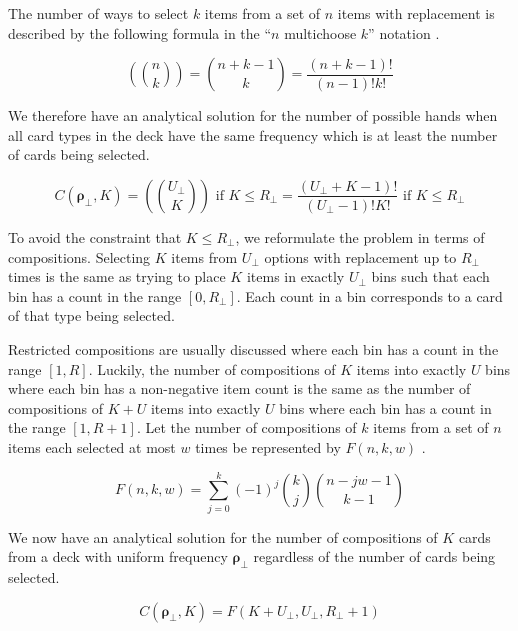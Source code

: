 \documentclass{article}
\begin{document}
The number of ways to select $k$ items from a set of $n$ items with replacement is described by the following formula in the ``$n$ multichoose $k$'' notation \cite{benjamin_quinn_2003}.

\begin{equation}
    \left (\binom{n}{k}\right) = \binom{n + k - 1}{k} = \frac{(n + k - 1)!}{(n - 1)!k!}
\end{equation}

We therefore have an analytical solution for the number of possible hands when all card types in the deck have the same frequency which is at least the number of cards being selected.

\begin{equation}
    C(\bm{\rho_{\bot}}, K) = \left (\binom{U_{\bot}}{K}\right) \text{ if } K \leq R_{\bot} = \frac{(U_{\bot} + K - 1)!}{(U_{\bot} - 1)!K!} \text{ if } K \leq R_{\bot}
\end{equation}

To avoid the constraint that $K\leq R_{\bot}$, we reformulate the problem in terms of compositions. Selecting $K$ items from $U_{\bot}$ options with replacement up to $R_\bot$ times is the same as trying to place $K$ items in exactly $U_{\bot}$ bins such that each bin has a count in the range $[0, R_{\bot}]$. Each count in a bin corresponds to a card of that type being selected.

Restricted compositions are usually discussed where each bin has a count in the range $[1, R]$. Luckily, the number of compositions of $K$ items into exactly $U$ bins where each bin has a non-negative item count is the same as the number of compositions of $K + U$ items into exactly $U$ bins where each bin has a count in the range $[1, R + 1]$. Let the number of compositions of $k$ items from a set of $n$ items each selected at most $w$ times be represented by $F(n, k, w)$ \cite{abramson}.

\begin{equation}
    F(n, k, w) = \sum_{j = 0}^k(-1)^j \binom{k}{j}\binom{n - jw - 1}{k - 1}
\end{equation}

We now have an analytical solution for the number of compositions of $K$ cards from a deck with uniform frequency $\bm{\rho_{\bot}}$ regardless of the number of cards being selected.

\begin{equation}
    C(\bm{\rho_\bot}, K) = F(K + U_\bot, U_\bot, R_\bot + 1)
\end{equation}
\end{document}
